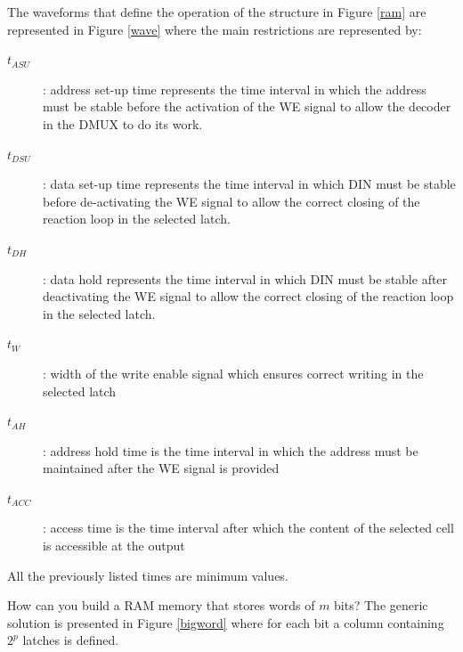 

The waveforms that define the operation of the structure in Figure \ref{ram} are represented in Figure \ref{wave} where the main restrictions are represented by:
\begin{description}
    \item[$t_{ASU}$]: address set-up time represents the time interval in which the address must be stable before the activation of the WE signal to allow the decoder in the DMUX to do its work.
    \item[$t_{DSU}$]: data set-up time represents the time interval in which DIN must be stable before de-activating the WE signal to allow the correct closing of the reaction loop in the selected latch.
    \item[$t_{DH}$]: data hold represents the time interval in which DIN must be stable after deactivating the WE signal to allow the correct closing of the reaction loop in the selected latch.
    \item[$t_{W}$]: width of the write enable signal which ensures correct writing in the selected latch
    \item[$t_{AH}$]: address hold time is the time interval in which the address must be maintained after the WE signal is provided
    \item[$t_{ACC}$]: access time is the time interval after which the content of the selected cell is accessible at the output
\end{description}
All the previously listed times are minimum values.

\textcolor[rgb]{0.00,0.00,0.00}{}


How can you build a RAM memory that stores words of $m$ bits? The generic solution is presented in Figure \ref{bigword} where for each bit a column containing $2^p$ latches is defined.


